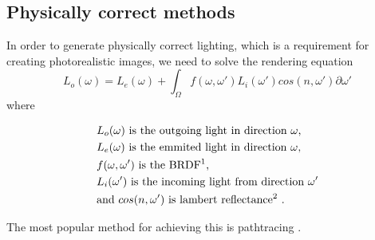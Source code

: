 \documentclass{ACGSeminar}
\begin{document}
	\subsection{Physically correct methods}
	In order to generate physically correct lighting, which is a requirement for creating photorealistic images, we need to solve the rendering equation
	$$ L_o(\omega) = L_e(\omega) + \int_\Omega f(\omega, \omega')L_i(\omega')cos(n, \omega') \partial \omega' $$
	where 
	\begin{center}
		\begin{align*}
			&L_o(\omega) \text{ is the outgoing light in direction } \omega\text{,}\\
			&L_e(\omega) \text{ is the emmited light in direction } \omega\text{,}\\
			&f(\omega, \omega') \text{ is the BRDF\footnotemark} \text{,}\\
			&L_i(\omega') \text{ is the incoming light from direction } \omega'\\
			&\text{and } cos(n, \omega') \text{ is lambert reflectance\footnotemark}  \text{ .}
		\end{align*}
	\end{center}
	\addtocounter{footnote}{-1}
	The most popular method for achieving this is pathtracing \cite{P2PATH}.
\end{document}
